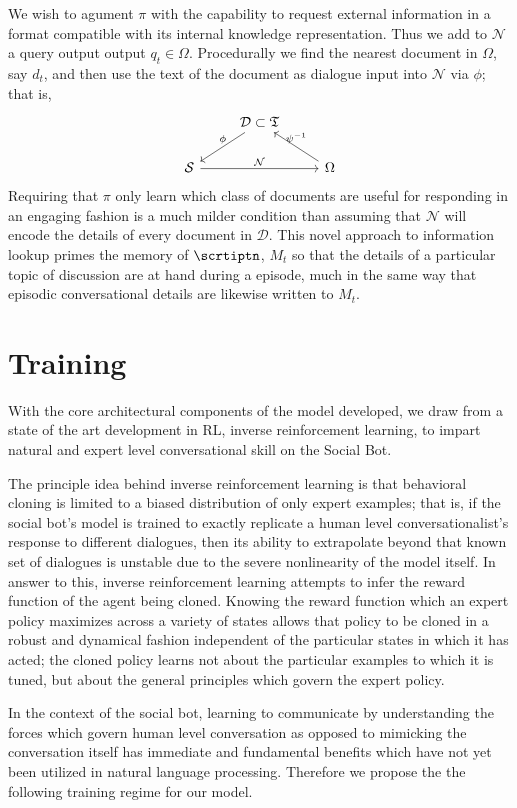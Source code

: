 \documentclass{article} %
\numberwithin{equation}{subsection}
\numberwithin{theorem}{subsection}
\theoremstyle{named}
\def\scriptd{{\mathcal D}}
\def\scriptn{{\mathcal N}}
\def\scripts{{\mathcal S}}
\begin{document}
\begin{enumerate}
We wish to agument $\pi$ with the capability to request external information in a format compatible with its internal knowledge representation. Thus we add to $\scriptn$ a query output output $q_t \in \Omega.$ Procedurally we find the nearest document in $\Omega$, say $d_t$, and then use the text of the document as dialogue input into $\scriptn$ via $\phi$; that is,
\begin{equation*}
  \begin{tikzcd} 
    & \scriptd \subset \mathfrak{T} \arrow{ld}[above]{\phi} & \\
    \scripts \arrow{rr}{\scriptn} & & \Omega \arrow{lu}[above]{\psi^{-1}}
  \end{tikzcd}
\end{equation*}
Requiring that $\pi$ only learn which class of documents are useful for responding in an engaging fashion is a much milder condition than assuming that $\scriptn$ will encode the details of every document in $\scriptd$. This novel approach to information lookup primes the memory of $\scrtiptn$, $M_t$ so that the details of a particular topic of discussion are at hand during a  episode, much in the same way that episodic conversational details are likewise written to $M_t$.
\end{enumerate}



\section{Training}
With the core architectural components of the model developed, we draw from a state of the art development in RL, inverse reinforcement learning, to impart natural and expert level conversational skill on the Social Bot. 


The principle idea behind inverse reinforcement learning is that behavioral cloning is limited to a biased distribution of only expert examples; that is, if the social bot’s model is trained to exactly replicate a human level conversationalist's response to different dialogues, then its ability to extrapolate beyond that known set of dialogues is unstable due to the severe nonlinearity of the model itself. In answer to this, inverse reinforcement learning attempts to infer the reward function of the agent being cloned. Knowing the reward function which an expert policy maximizes across a variety of states allows that policy to be cloned in a robust and dynamical fashion independent of the particular states in which it has acted; the cloned policy learns not about the particular examples to which it is tuned, but about the general principles which govern the expert policy.


In the context of the social bot, learning to communicate by understanding the forces which govern human level conversation as opposed to mimicking the conversation itself has immediate and fundamental benefits which have not yet been utilized in natural language processing. Therefore we propose the the following training regime for our model.


%
\end{document}
